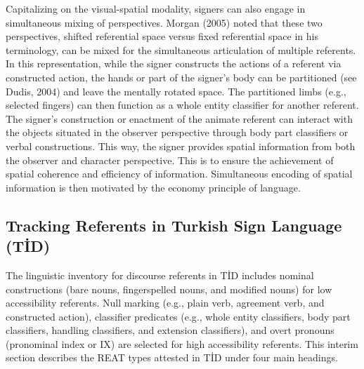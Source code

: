 \documentclass[
  english,
  doc,mask]{apa6}
\begin{document}
Capitalizing on the visual-spatial modality, signers can also engage in simultaneous mixing of perspectives. Morgan (2005) noted that these two perspectives, shifted referential space versus fixed referential space in his terminology, can be mixed for the simultaneous articulation of multiple referents. In this representation, while the signer constructs the actions of a referent via constructed action, the hands or part of the signer's body can be partitioned (see Dudis, 2004) and leave the mentally rotated space. The partitioned limbs (e.g., selected fingers) can then function as a whole entity classifier for another referent. The signer's construction or enactment of the animate referent can interact with the objects situated in the observer perspective through body part classifiers or verbal constructions. This way, the signer provides spatial information from both the observer and character perspective. This is to ensure the achievement of spatial coherence and efficiency of information. Simultaneous encoding of spatial information is then motivated by the economy principle of language.

\hypertarget{tracking-referents-in-turkish-sign-language-tid}{%
\subsection{Tracking Referents in Turkish Sign Language (TİD)}\label{tracking-referents-in-turkish-sign-language-tid}}

The linguistic inventory for discourse referents in TİD includes nominal constructions (bare nouns, fingerspelled nouns, and modified nouns) for low accessibility referents. Null marking (e.g., plain verb, agreement verb, and constructed action), classifier predicates (e.g., whole entity classifiers, body part classifiers, handling classifiers, and extension classifiers), and overt pronouns (pronominal index or IX) are selected for high accessibility referents. This interim section describes the REAT types attested in TİD under four main headings.
\end{document}
